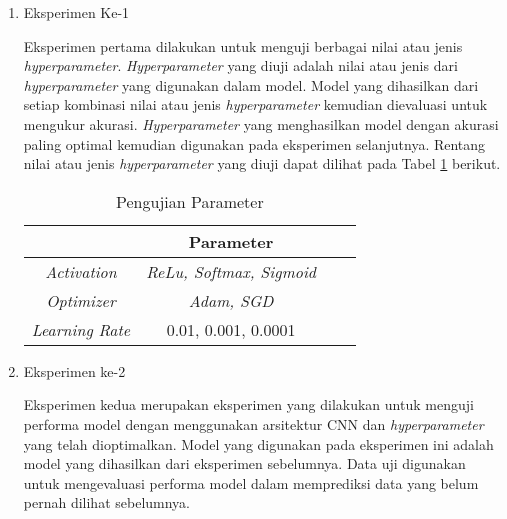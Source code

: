      \begin{enumerate}
  
        \item Eksperimen Ke-1

        Eksperimen pertama dilakukan untuk menguji berbagai nilai atau jenis \textit{hyperparameter}. \textit{Hyperparameter} yang diuji adalah nilai atau jenis dari \textit{hyperparameter} yang digunakan dalam model. Model yang dihasilkan dari setiap kombinasi nilai atau jenis \textit{hyperparameter} kemudian dievaluasi untuk mengukur akurasi. \textit{Hyperparameter} yang menghasilkan model dengan akurasi paling optimal kemudian digunakan pada eksperimen selanjutnya. Rentang nilai atau jenis \textit{hyperparameter} yang diuji dapat dilihat pada Tabel \ref{Pengujian Parameter} berikut.



            \begin{table}[h]
            \centering
            \caption{Pengujian Parameter}
            \begin{tabular}{cccc}
                \toprule
                \textbf{} & \textbf{Parameter} \\
                \midrule
                      
                          \textit{Activation}  &  \textit{ReLu, Softmax, Sigmoid }\\
                         \textit{Optimizer} &  \textit{Adam, SGD} \\
                          \textit{Learning Rate} &  0.01, 0.001, 0.0001 \\
            
                \bottomrule
            \end{tabular}
            \label{Pengujian Parameter}
        \end{table}
        
        
        \item Eksperimen ke-2

        Eksperimen kedua merupakan eksperimen yang dilakukan untuk menguji performa model dengan menggunakan arsitektur CNN dan \textit{hyperparameter} yang telah dioptimalkan. Model yang digunakan pada eksperimen ini adalah model yang dihasilkan dari eksperimen sebelumnya. Data uji digunakan untuk mengevaluasi performa model dalam memprediksi data yang belum pernah dilihat sebelumnya.

        
       
    \end{enumerate}




